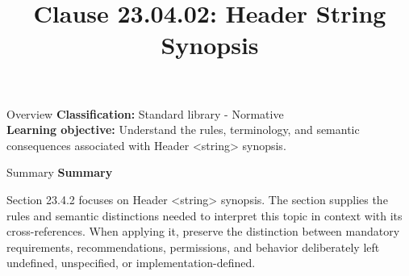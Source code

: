 \documentclass[10pt,letterpaper]{article}
\title{Clause 23.04.02: Header String Synopsis}
\author{}
\date{}
\begin{document}
\maketitle
\begin{CornellOverviewBox}{Overview}
\textbf{Classification:} Standard library - Normative\\[2pt]
\textbf{Learning objective:} Understand the rules, terminology, and semantic consequences associated with Header <string> synopsis.
\end{CornellOverviewBox}\begin{CornellSummaryBox}{Summary}
{\sffamily\bfseries\color{Accent} Summary}\par\vspace{3pt}Section 23.4.2 focuses on Header <string> synopsis. The section supplies the rules and semantic distinctions needed to interpret this topic in context with its cross-references. When applying it, preserve the distinction between mandatory requirements, recommendations, permissions, and behavior deliberately left undefined, unspecified, or implementation-defined.
\end{CornellSummaryBox}
\end{document}
